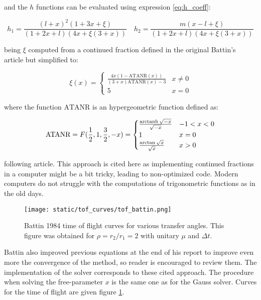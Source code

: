 and the $h$ functions can be evaluated using expression \ref{eq:h_coeff}:

\begin{equation}
  h_1 = \frac{(l+x)^2(1 + 3x + \xi)}{(1+2x+l)(4x + \xi(3+x))}\quad
  h_2 = \frac{m(x-l+\xi)}{(1+2x+l)(4x + \xi(3+x))}
  \label{eq:h_coeff}
\end{equation}

being $\xi$ computed from a continued fraction defined in the original Battin's
article but simplified to:

\begin{equation}
  \xi(x) =
  \begin{cases}
    \frac{4x(1 - \text{ATANR}(x))}{(3 +x)\text{ATANR}(x) - 3} &
    \text{$x\neq0$}                                                            \\
    5                                                         & \text{$x = 0$}
  \end{cases}
\end{equation}

where the function $\text{ATANR}$ is an hypergeometric function defined as:

\begin{equation}
  \text{ATANR} = F(\frac{1}{2}, 1, \frac{3}{2}, -x) =
  \begin{cases}
    \frac{\operatorname{arctanh}{\sqrt{-x}}}{\sqrt{-x}} & \text{$-1 < x < 0$} \\
    1                                     & \text{$x = 0$}      \\
    \frac{\arctan{\sqrt{x}}}{\sqrt{x}}    & \text{$x > 0$}
  \end{cases}
\end{equation}

following \cite{allen2015} article. This approach is cited here as
implementing continued fractions in a computer might be a bit tricky, leading to
non-optimized code. Modern computers do not struggle with the computations of
trigonometric functions as in the old days.

\vspace{0.5cm}
\begin{figure}[h]
  \centering
  \texttt{[image: static/tof\_curves/tof\_battin.png]}
  \caption{Battin 1984 time of flight curves for various transfer angles. This
    figure was obtained for $\rho=r_2/r_1=2$ with unitary $\mu$ and $\Delta t$.}
  \label{fig:tof_battin}
\end{figure}


Battin also improved previous equations at the end of his report to improve even
more the convergence of the method, so reader is encouraged to review them. The
implementation of the solver corresponds to these cited approach. The procedure
when solving the free-parameter $x$ is the same one as for the Gauss solver.
Curves for the time of flight are given figure \ref{fig:tof_battin}.

